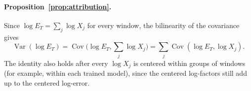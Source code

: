 \paragraph{Proposition~\ref{prop:attribution}.} Since $\log E_T=\sum_j\log X_j$ for every window, the bilinearity of the covariance gives
\[
\operatorname{Var}(\log E_T)=\operatorname{Cov}\Big(\log E_T,\sum_j\log X_j\Big)=\sum_j\operatorname{Cov}(\log E_T,\log X_j).
\]
The identity also holds after every $\log X_j$ is centered within groups of windows (for example, within each trained model), since the centered log-factors still add up to the centered log-error.
